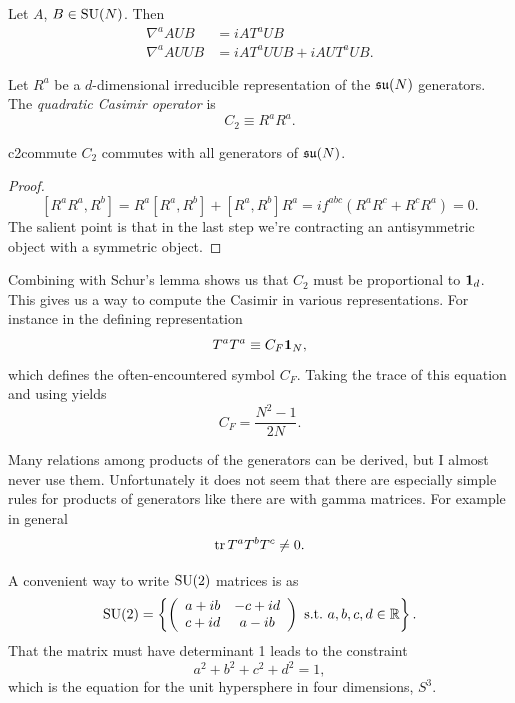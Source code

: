 \begin{example*}{}{}
Let $A$, $B\in\operatorname{SU}(N)$. Then
\begin{equation*}\begin{aligned}
\nabla^a AUB&=iAT^aUB\\
\nabla^a AUUB&=iAT^aUUB + iAUT^aUB.
\end{aligned}\end{equation*}
\end{example*}

Let $R^a$ be a $d$-dimensional irreducible representation of the
$\operatorname{\mathfrak{su}}(N)$ generators. The {\it quadratic Casimir operator}
is
\begin{equation}\label{eq:quadCasimir}
C_2\equiv R^a R^a.
\end{equation}

\begin{proposition}{}{c2commute}
$C_2$ commutes with all generators of $\operatorname{\mathfrak{su}}(N)$.
\begin{proof}
$$
\left[R^a R^a, R^b\right]=R^a\left[R^a, R^b\right]+\left[R^a, R^b\right] R^a=i
f^{a b c}\left(R^a R^c+R^c R^a\right)=0.
$$
The salient point is that in the last step we're contracting an antisymmetric
object with a symmetric object.
\end{proof}
\end{proposition}
Combining  with Schur's lemma shows us that
$C_2$ must be proportional to ${\mathbf 1}_d$. This gives us a way
to compute the Casimir in various representations. For
instance in the defining representation
\begin{equation}
T^aT^a\equiv C_F{\mathbf 1}_N,
\end{equation}
which defines the often-encountered symbol $C_F$.
Taking the trace of this equation and using
 yields
\begin{equation}\label{eq:casfund}
C_F=\frac{N^2-1}{2N}.
\end{equation}

Many relations among products of the generators can be derived, but
I almost never use them. Unfortunately it does not seem that there
are especially simple rules for products of generators like there
are with gamma matrices. For example in general
\begin{equation}
\tr T^aT^bT^c\neq0.
\end{equation}

A convenient way to write $\operatorname{SU}(2)$ matrices is as
\begin{equation}
\operatorname{SU}(2)=\left\{
\left(\begin{array}{cc}
          a+ib   & -c+id  \\
          c+id   &  a-ib  \\
            \end{array}\right)~\text{s.t.}~ a,b,c,d\in\mathbb{R} \right\}.
\end{equation} 
That the matrix must have determinant 1 leads to the constraint
\begin{equation}
a^2+b^2+c^2+d^2=1,
\end{equation} 
which is the equation for the unit hypersphere in four dimensions, $S^3$. 

